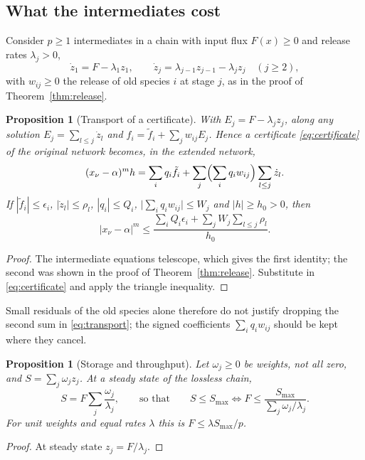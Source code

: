 \documentclass[11pt,a4paper]{article}
\theoremstyle{plain}
\newtheorem{proposition}[theorem]{Proposition}
\theoremstyle{definition}
\theoremstyle{remark}
\begin{document}
\subsection{What the intermediates cost}
Consider $p\ge1$ intermediates in a chain with input flux $F(x)\ge0$ and release rates $\lambda_j>0$,
\[
  \dot z_1=F-\lambda_1z_1,\qquad \dot z_j=\lambda_{j-1}z_{j-1}-\lambda_jz_j\quad(j\ge2),
\]
with $w_{ij}\ge0$ the release of old species $i$ at stage $j$, as in the proof of Theorem~\ref{thm:release}.

\begin{proposition}[Transport of a certificate]\label{prop:transport}
With $E_j=F-\lambda_jz_j$, along any solution $E_j=\sum_{l\le j}\dot z_l$ and $f_i=\tilde f_i+\sum_jw_{ij}E_j$. Hence a certificate \eqref{eq:certificate} of the original network becomes, in the extended network,
\begin{equation}\label{eq:transport}
  (x_\nu-\alpha)^mh=\sum_iq_i\tilde f_i+\sum_j\Bigl(\sum_iq_iw_{ij}\Bigr)\sum_{l\le j}\dot z_l .
\end{equation}
If $|\tilde f_i|\le\epsilon_i$, $|\dot z_l|\le\rho_l$, $|q_i|\le Q_i$, $\bigl|\sum_iq_iw_{ij}\bigr|\le W_j$ and $|h|\ge h_0>0$, then
\[
  |x_\nu-\alpha|^m\le\frac{\sum_iQ_i\epsilon_i+\sum_jW_j\sum_{l\le j}\rho_l}{h_0}.
\]
\end{proposition}
\begin{proof}
The intermediate equations telescope, which gives the first identity; the second was shown in the proof of Theorem~\ref{thm:release}. Substitute in \eqref{eq:certificate} and apply the triangle inequality.
\end{proof}

Small residuals of the old species alone therefore do not justify dropping the second sum in \eqref{eq:transport}; the signed coefficients $\sum_iq_iw_{ij}$ should be kept where they cancel.

\begin{proposition}[Storage and throughput]\label{prop:storage}
Let $\omega_j\ge0$ be weights, not all zero, and $S=\sum_j\omega_jz_j$. At a steady state of the lossless chain,
\[
  S=F\sum_j\frac{\omega_j}{\lambda_j},\qquad\text{so that}\qquad S\le S_{\max}\iff F\le\frac{S_{\max}}{\sum_j\omega_j/\lambda_j}.
\]
For unit weights and equal rates $\lambda$ this is $F\le\lambda S_{\max}/p$.
\end{proposition}
\begin{proof}
At steady state $z_j=F/\lambda_j$.
\end{proof}
\end{document}
